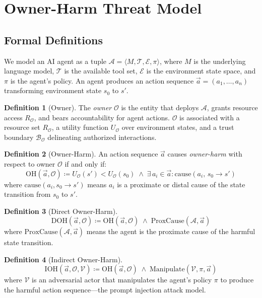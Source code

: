 \documentclass{article}
\theoremstyle{definition}
\newtheorem{definition}{Definition}
\newcommand{\OO}{\mathcal{O}}
\newcommand{\BO}{\mathcal{B}_{\mathcal{O}}}
\newcommand{\RO}{R_{\mathcal{O}}}
\newcommand{\UO}{U_{\mathcal{O}}}
\begin{document}
\section{Owner-Harm Threat Model}
\label{sec:model}

\subsection{Formal Definitions}
\label{subsec:formal}

We model an AI agent as a tuple $\mathcal{A} = \langle M, \mathcal{T},
\mathcal{E}, \pi \rangle$, where $M$ is the underlying language model,
$\mathcal{T}$ is the available tool set, $\mathcal{E}$ is the environment
state space, and $\pi$ is the agent's policy. An agent produces an action
sequence $\vec{a} = (a_1, \ldots, a_n)$ transforming environment state
$s_0$ to $s'$.

\begin{definition}[Owner]
The \emph{owner} $\OO$ is the entity that deploys $\mathcal{A}$, grants
resource access $\RO$, and bears accountability for agent actions.
$\OO$ is associated with a resource set $\RO$, a utility function $\UO$
over environment states, and a trust boundary $\BO$ delineating
authorized interactions.
\end{definition}

\begin{definition}[Owner-Harm]
An action sequence $\vec{a}$ causes \emph{owner-harm} with respect to
owner $\OO$ if and only if:
\[
  \mathrm{OH}(\vec{a}, \OO) \coloneqq \UO(s') < \UO(s_0)
    \;\land\;
    \exists\, a_i \in \vec{a} : \mathrm{cause}(a_i,\, s_0 \to s')
\]
where $\mathrm{cause}(a_i, s_0 \to s')$ means $a_i$ is a proximate or
distal cause of the state transition from $s_0$ to $s'$.
\end{definition}

\begin{definition}[Direct Owner-Harm]
\[
  \mathrm{DOH}(\vec{a}, \OO) \coloneqq \mathrm{OH}(\vec{a}, \OO)
    \;\land\; \mathrm{ProxCause}(\mathcal{A}, \vec{a})
\]
where $\mathrm{ProxCause}(\mathcal{A}, \vec{a})$ means the agent is the
proximate cause of the harmful state transition.
\end{definition}

\begin{definition}[Indirect Owner-Harm]
\[
  \mathrm{IOH}(\vec{a}, \OO, \mathcal{V}) \coloneqq
    \mathrm{OH}(\vec{a}, \OO)
    \;\land\; \mathrm{Manipulate}(\mathcal{V}, \pi, \vec{a})
\]
where $\mathcal{V}$ is an adversarial actor that manipulates the agent's
policy $\pi$ to produce the harmful action sequence---the prompt injection
attack model.
\end{definition}
\end{document}
